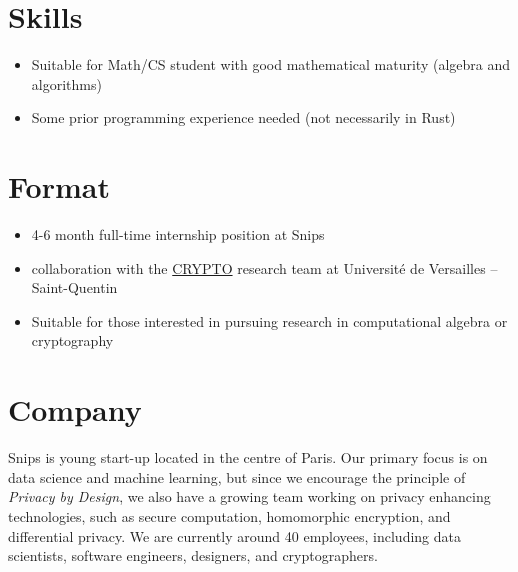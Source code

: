 \documentclass{article}
\begin{document}
\section*{Skills}
\begin{itemize}
\item Suitable for Math/CS student with good mathematical maturity (algebra and algorithms)
\item Some prior programming experience needed (not necessarily in Rust)
\end{itemize}

\section*{Format}
\begin{itemize}
\item 4-6 month full-time internship position at Snips
\item collaboration with the
  \href{http://lmv.math.cnrs.fr/equipes/crypto/}{CRYPTO} research team
  at Université de Versailles -- Saint-Quentin
\item Suitable for those interested in pursuing research in computational algebra or cryptography
\end{itemize}

\section*{Company}
Snips is young start-up located in the centre of Paris. Our primary focus is on data science and machine learning, but since we encourage the principle of \emph{Privacy by Design}, we also have a growing team working on privacy enhancing technologies, such as secure computation, homomorphic encryption, and differential privacy. We are currently around 40 employees, including data scientists, software engineers, designers, and cryptographers.
\end{document}
